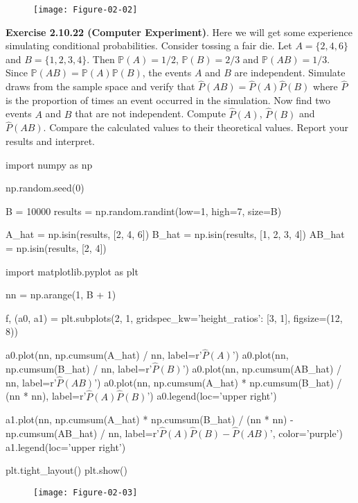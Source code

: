 \begin{figure}[H]
\texttt{[image: Figure-02-02]}
\end{figure}

\textbf{Exercise 2.10.22 (Computer Experiment)}. Here we will get some
experience simulating conditional probabilities. Consider tossing a fair
die. Let \(A = \{2, 4, 6\}\) and \(B = \{1, 2, 3, 4\}\). Then
\(\mathbb{P}(A) = 1/2\), \(\mathbb{P}(B) = 2/3\) and
\(\mathbb{P}(AB) = 1/3\). Since
\(\mathbb{P}(AB) = \mathbb{P}(A) \mathbb{P}(B)\), the events \(A\) and
\(B\) are independent. Simulate draws from the sample space and verify
that \(\hat{P}(AB) = \hat{P}(A) \hat{P}(B)\) where \(\hat{P}\) is the
proportion of times an event occurred in the simulation. Now find two
events \(A\) and \(B\) that are not independent. Compute \(\hat{P}(A)\),
\(\hat{P}(B)\) and \(\hat{P}(AB)\). Compare the calculated values to
their theoretical values. Report your results and interpret.

\begin{python}
import numpy as np

np.random.seed(0)

B = 10000
results = np.random.randint(low=1, high=7, size=B)

A_hat = np.isin(results, [2, 4, 6])
B_hat = np.isin(results, [1, 2, 3, 4])
AB_hat = np.isin(results, [2, 4])
\end{python}

\begin{python}
import matplotlib.pyplot as plt

nn = np.arange(1, B + 1)


f, (a0, a1) = plt.subplots(2, 1, gridspec_kw={'height_ratios': [3, 1]}, figsize=(12, 8))

a0.plot(nn, np.cumsum(A_hat) / nn, label=r'$\hat{P}(A)$')
a0.plot(nn, np.cumsum(B_hat) / nn, label=r'$\hat{P}(B)$')
a0.plot(nn, np.cumsum(AB_hat) / nn, label=r'$\hat{P}(AB)$')
a0.plot(nn, np.cumsum(A_hat) * np.cumsum(B_hat) / (nn * nn), label=r'$\hat{P}(A) \hat{P}(B)$')
a0.legend(loc='upper right')

a1.plot(nn, np.cumsum(A_hat) * np.cumsum(B_hat) / (nn * nn) - np.cumsum(AB_hat) / nn, 
         label=r'$\hat{P}(A) \hat{P}(B)- \hat{P}(AB)$', color='purple')
a1.legend(loc='upper right')

plt.tight_layout()
plt.show()
\end{python}

\begin{figure}[H]
\texttt{[image: Figure-02-03]}
\end{figure}

